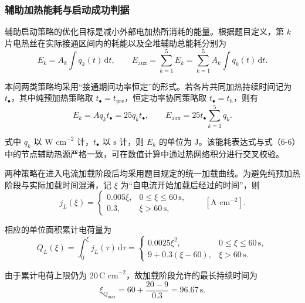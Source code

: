 \documentclass[bwprint]{gmcmthesis}
\numberwithin{figure}{section}
\begin{document}
\subsubsection{辅助加热能耗与启动成功判据}

\noindent 辅助启动策略的优化目标是减小外部电加热所消耗的能量。根据题目定义，第 \(k\) 片电热丝在实际接通区间内的耗能以及全堆辅助总能耗分别为
\begin{equation}
E_k = A_k \int q_k(t) \, \text{d}t, \qquad E_{\text{aux}} = \sum_{k=1}^5 E_k = \sum_{k=1}^5 A_k \int q_k(t) \, \text{d}t. \tag{6-14}
\end{equation}

\noindent 本问两类策略均采用“接通期间功率恒定”的形式。若各片共同加热持续时间记为 \(t_\bullet\)，其中纯预加热策略取 \(t_\bullet = t_{\text{pre}}\)，恒定功率协同策略取 \(t_\bullet = t_h\)，则有
\begin{equation}
E_k = A q_k t_\bullet = 25 q_k t_\bullet, \qquad E_{\text{aux}} = 25 t_\bullet \sum_{k=1}^5 q_k. \tag{6-15}
\end{equation}

\noindent 式中 \(q_k\) 以 \(\text{W cm}^{-2}\) 计，\(t_\bullet\) 以 \(\text{s}\) 计，则 \(E_k\) 的单位为 \(\text{J}\)。该能耗表达式与式（6-6）中的节点辅助热源严格一致，可在数值计算中通过热网络积分进行交叉校验。

\noindent 两种策略在进入电流加载阶段后均采用题目规定的统一加载曲线。为避免纯预加热阶段与实际加载时间混淆，记 \(\xi\) 为“自电流开始加载后经过的时间”，则
\begin{equation}
j_L(\xi) = \begin{cases}
0.005\xi, & 0 \leq \xi \leq 60 \, \text{s}, \\
0.3, & \xi > 60 \, \text{s},
\end{cases} \qquad [\text{A cm}^{-2}]. \tag{6-16}
\end{equation}

\noindent 相应的单位面积累计电荷量为
\begin{equation}
Q_L(\xi) = \int_0^\xi j_L(\tau) \, \text{d}\tau = \begin{cases}
0.0025\xi^2, & 0 \leq \xi \leq 60 \, \text{s}, \\
9 + 0.3(\xi - 60), & \xi > 60 \, \text{s}.
\end{cases} \tag{6-17}
\end{equation}

\noindent 由于累计电荷上限仍为 \(20 \, \text{C cm}^{-2}\)，故加载阶段允许的最长持续时间为
\begin{equation}
\xi_{Q_{\text{max}}} = 60 + \frac{20 - 9}{0.3} = 96.67 \, \text{s}. \tag{6-18}
\end{equation}
\end{document}
